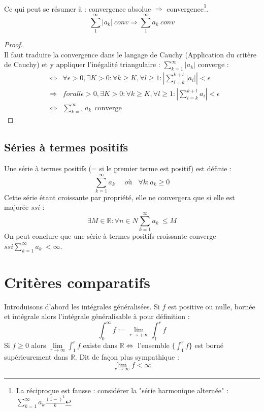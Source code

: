 \documentclass[11pt, a4paper, openany]{book}
\begin{document}
\ \\
		
Ce qui peut se résumer à : convergence absolue $\Rightarrow$ convergence\footnote{La réciproque est fausse : considérer la "série harmonique alternée" : $\sum_{k=1}^\infty a_k \frac{(1-)^k}{k}$}. $$\sum_1^{\infty}|a_k|\ conv\Rightarrow \sum_1^{\infty}a_k\ conv$$
\begin{proof}
	\ \\
	Il faut traduire la convergence dans le langage de Cauchy (Application du critère de Cauchy) et y appliquer l'inégalité triangulaire : $\sum_{k=1}^\infty |a_k|$ converge :
	\begin{eqnarray}
		&\Leftrightarrow & \forall \epsilon > 0, \exists K > 0 : \forall k \geq K, \forall l \geq 1 : \left|\sum_{i=k}^{k+l} |a_i| \right| < \epsilon\\
		&\Rightarrow & forall \epsilon > 0, \exists K > 0 : \forall k \geq K, \forall l \geq 1 : \left|\sum_{i=k}^{k+l} a_i \right| < \epsilon\\
		&\Leftrightarrow & \sum_{k=1}^\infty a_k\ \ \text{converge}
	\end{eqnarray}
\end{proof}
		
		
\subsection{Séries à termes positifs}
Une série à termes positifs (= si le premier terme est positif) est définie :
\begin{equation}
	\sum_{k=1}^\infty a_k\ \ \ \ \ \ où\ \ \ \ \forall k : a_k \geq 0
\end{equation}
Cette série étant croissante par propriété, elle ne convergera que si elle est majorée $ssi$ : 
\begin{equation}
	\exists M \in \mathbb{R} : \forall n \in N \sum_{k=1}^\infty a_k\ \leq M
\end{equation}  On peut conclure que une série à termes positifs croissante converge $ssi \sum_{k=1}^\infty a_k\ < \infty$.
		
\section{Critères comparatifs}
Introduisons d'abord les intégrales généralisées. Si $f$ est positive ou nulle, bornée et intégrale alors l'intégrale généralisable à pour définition :
\begin{equation}
	\int_0^\infty f := \lim\limits_{r \rightarrow +\infty}  \int_1^r f
\end{equation}
Si $f \geq 0$ alors $\lim\limits_{r \rightarrow \infty}  \int_1^r f$ existe dans $\mathbb{R} \Leftrightarrow$ l'ensemble $\{\int_1^r f\}$ est borné supérieurement dans $\mathbb{R}$. Dit de façon plus sympathique :
\begin{equation}
	\lim\limits_{r \rightarrow \infty} f < \infty
\end{equation}
\end{document}
